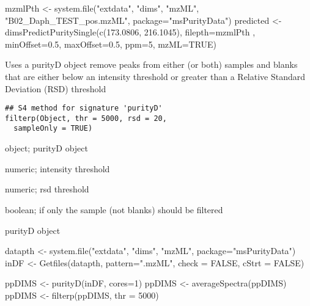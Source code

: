 \documentclass[letterpaper]{book}
\begin{document}
%
\begin{Examples}
\begin{ExampleCode}
mzmlPth <- system.file("extdata", "dims", "mzML", "B02_Daph_TEST_pos.mzML", package="msPurityData")
predicted <- dimsPredictPuritySingle(c(173.0806, 216.1045), filepth=mzmlPth , minOffset=0.5, maxOffset=0.5, ppm=5, mzML=TRUE)
\end{ExampleCode}
\end{Examples}
%
\begin{Description}\relax
Uses a purityD object remove peaks from either (or both) samples and
blanks that are either below an intensity threshold
or greater than a Relative Standard Deviation (RSD) threshold
\end{Description}
%
\begin{Usage}
\begin{verbatim}
## S4 method for signature 'purityD'
filterp(Object, thr = 5000, rsd = 20,
  sampleOnly = TRUE)
\end{verbatim}
\end{Usage}
%
\begin{Arguments}
\begin{ldescription}
\item[\code{Object}] object; purityD object

\item[\code{thr}] numeric; intensity threshold

\item[\code{rsd}] numeric; rsd threshold

\item[\code{sampleOnly}] boolean; if only the sample (not blanks) should be filtered
\end{ldescription}
\end{Arguments}
%
\begin{Value}
purityD object
\end{Value}
%
\begin{Examples}
\begin{ExampleCode}

datapth <- system.file("extdata", "dims", "mzML", package="msPurityData")
inDF <- Getfiles(datapth, pattern=".mzML", check = FALSE, cStrt = FALSE)

ppDIMS <- purityD(inDF, cores=1)
ppDIMS <- averageSpectra(ppDIMS)
ppDIMS <- filterp(ppDIMS, thr = 5000)
\end{ExampleCode}
\end{Examples}
\end{document}

